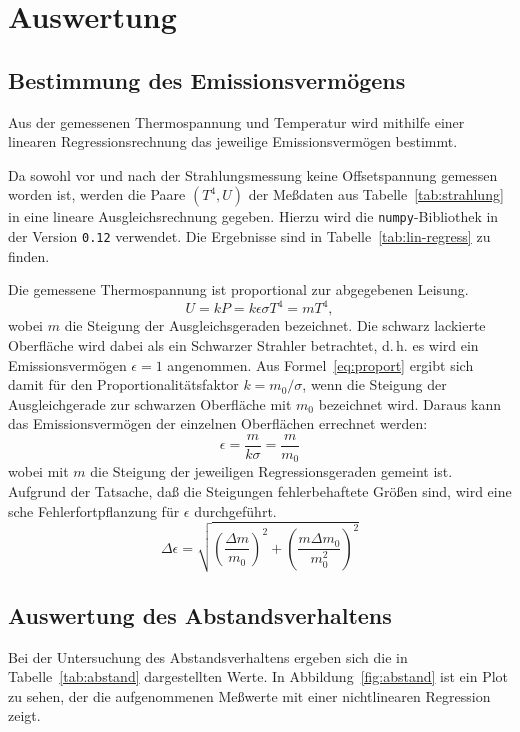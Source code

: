 
\section{Auswertung}

\subsection{Bestimmung des Emissionsvermögens}

Aus der gemessenen Thermospannung und Temperatur wird mithilfe einer
linearen Regressionsrechnung das jeweilige Emissionsvermögen bestimmt.

Da sowohl vor und nach der Strahlungsmessung keine Offsetspannung
gemessen worden ist, werden die Paare $(T^4, U)$ der Meßdaten aus
Tabelle~\ref{tab:strahlung} in eine lineare Ausgleichsrechnung
gegeben. Hierzu wird die \texttt{numpy}-Bibliothek in der Version
\texttt{0.12} verwendet. Die Ergebnisse sind in
Tabelle~\ref{tab:lin-regress} zu finden.

Die gemessene Thermospannung ist proportional zur abgegebenen
Leisung.
\begin{equation}
  \label{eq:proport}
  U = k P = k \epsilon \sigma T^4 = m T^4,
\end{equation}
wobei $m$ die Steigung der Ausgleichsgeraden bezeichnet. Die schwarz
lackierte Oberfläche wird dabei als ein Schwarzer Strahler betrachtet,
d.\,h. es wird ein Emissionsvermögen $\epsilon = 1$ angenommen. Aus
Formel~\ref{eq:proport} ergibt sich damit für den
Proportionalitätsfaktor $k = m_0/\sigma$, wenn die Steigung der
Ausgleichgerade zur schwarzen Oberfläche mit $m_0$ bezeichnet
wird. Daraus kann das Emissionsvermögen der einzelnen Oberflächen
errechnet werden:
\begin{equation}
  \epsilon = \frac{m}{k \sigma} = \frac{m}{m_0}
\end{equation}
wobei mit $m$ die Steigung der jeweiligen Regressionsgeraden gemeint
ist. Aufgrund der Tatsache, daß die Steigungen fehlerbehaftete Größen
sind, wird eine sche Fehlerfortpflanzung für $\epsilon$
durchgeführt.
\begin{equation}
  \label{eq:gauss-epsilon}
  \Delta\epsilon = \sqrt{ \left(\frac{\Delta m}{m_0}\right)^2 +
    \left(\frac{m \Delta m_0}{m_0^2}\right)^2}
\end{equation}

\subsection{Auswertung des Abstandsverhaltens}

Bei der Untersuchung des Abstandsverhaltens ergeben sich die in
Tabelle~\ref{tab:abstand} dargestellten Werte. In
Abbildung~\ref{fig:abstand} ist ein Plot zu sehen, der die aufgenommenen
Meßwerte mit einer nichtlinearen Regression zeigt.
